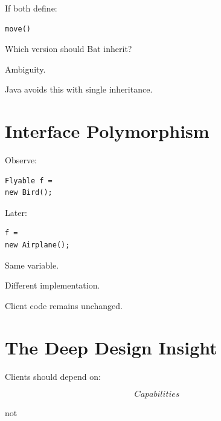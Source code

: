 \documentclass[11pt,a4paper]{book}
\begin{document}

If both define:

\begin{verbatim}
move()
\end{verbatim}


Which version should Bat inherit?


Ambiguity.


Java avoids this with single inheritance.


\section{Interface Polymorphism}

Observe:

\begin{verbatim}
Flyable f =
new Bird();
\end{verbatim}


Later:

\begin{verbatim}
f =
new Airplane();
\end{verbatim}


Same variable.

Different implementation.


Client code remains unchanged.


\section{The Deep Design Insight}

Clients should depend on:

\[
Capabilities
\]

not
\end{document}
